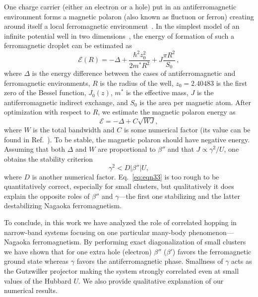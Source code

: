 One charge carrier (either an electron or a hole) put in an antiferromagnetic environment forms a magnetic polaron (also known as fluctuon or ferron) creating around itself a local ferromagnetic environment~\cite{krivoglaz1973fluctuating,nagaev1983physics,nagaev2001colossal,visscher1974phase,mott1973metal,auslender1981magnetic,auslender2005electron,auslender2006electron,soriano2020magnetic}. In the simplest model of an infinite potential well in two dimensions~\cite{soriano2020magnetic}, the energy of formation of such a ferromagnetic droplet can be estimated as
\begin{equation*}%
    \mathcal{E}(R) = -\Delta + \frac{\hbar^2 z_0^2}{2m^*R^2} + J\frac{\pi R^2}{S_0} \,,
\end{equation*}
where $\Delta$ is the energy difference between the cases of antiferromagnetic and ferromagnetic environments,
$R$ is the radius of the well, $z_0 = 2.40483$ is the first zero of the Bessel function, $J_0(z)$, $m^*$ is the effective mass, $J$ is the antiferromagnetic indirect exchange, and $S_0$ is the area per magnetic atom. After optimization with respect to $R$, we estimate the magnetic polaron energy as
\begin{equation*}%
    \mathcal{E} = -\Delta + C\sqrt{WJ},
\end{equation*}
where $W$ is the total bandwidth and $C$ is some numerical factor (its value can be found in Ref.~\cite{soriano2020magnetic}). To be stable, the magnetic polaron should have negative energy. Assuming that both $\Delta$ and $W$ are proportional to $\beta''$ and that $J \propto \gamma^2/U$, one obtains the stability criterion
\begin{equation}\label{eq:eqn33}
    \gamma^2 < D|\beta''|U,
\end{equation}
where $D$ is another numerical factor. Eq.~\eqref{eq:eqn33} is too rough to be quantitatively correct, especially for small clusters, but qualitatively it does explain the opposite roles of $\beta''$ and $\gamma$---the first one stabilizing and the latter destabilizing Nagaoka ferromagnetism. 

To conclude, in this work we have analyzed the role of correlated hopping in narrow-band systems focusing on one particular many-body phenomenon---Nagaoka ferromagnetism. By performing exact diagonalization of small clusters we have shown that for one extra hole (electron) $\beta''$ ($\beta'$) favors the ferromagnetic ground state whereas $\gamma$ favors the antiferromagnetic phase. Smallness of $\gamma$ acts as the Gutzwiller projector making the system strongly correlated even at small values of the Hubbard $U$. We also provide qualitative explanation of our numerical results. 



